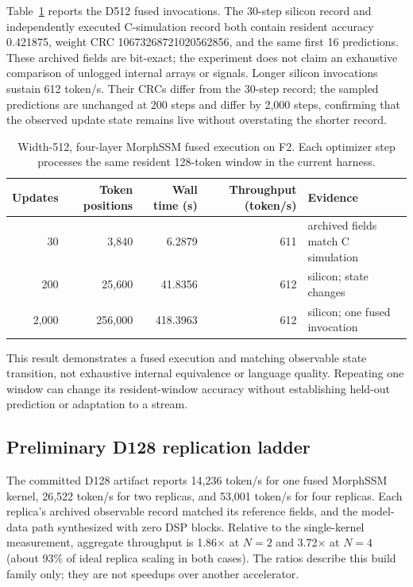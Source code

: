 \documentclass[10pt]{article}
\begin{document}
Table~\ref{tab:d512} reports the D512 fused invocations.  The 30-step silicon
record and independently executed C-simulation record both contain resident
accuracy 0.421875, weight CRC 10673268721020562856, and the same first 16
predictions.  These archived fields are bit-exact; the experiment does not
claim an exhaustive comparison of unlogged internal arrays or signals.  Longer
silicon invocations sustain 612 token/s.  Their CRCs differ from the 30-step
record; the sampled predictions are unchanged at 200 steps and differ by 2,000
steps, confirming that the observed update state remains live without
overstating the shorter record.

\begin{table}[t]
\centering
\caption{Width-512, four-layer MorphSSM fused execution on F2.  Each optimizer
step processes the same resident 128-token window in the current harness.}
\label{tab:d512}
\small
\begin{tabular}{rrrrl}
\toprule
Updates & Token positions & Wall time (s) & Throughput (token/s) & Evidence \\
\midrule
30   & 3,840   & 6.2879   & 611 & archived fields match C simulation \\
200  & 25,600  & 41.8356  & 612 & silicon; state changes \\
2,000& 256,000 & 418.3963 & 612 & silicon; one fused invocation \\
\bottomrule
\end{tabular}
\end{table}

This result demonstrates a fused execution and matching observable state
transition, not exhaustive internal equivalence or language quality.  Repeating
one window can change its resident-window accuracy without establishing
held-out prediction or adaptation to a stream.

\subsection{Preliminary D128 replication ladder}

The committed D128 artifact reports 14,236 token/s for one fused MorphSSM
kernel, 26,522 token/s for two replicas, and 53,001 token/s for four replicas.
Each replica's archived observable record matched its reference fields, and the
model-data path synthesized with zero DSP blocks.  Relative to the single-kernel
measurement, aggregate throughput is 1.86$\times$ at $N=2$ and 3.72$\times$ at
$N=4$ (about 93\% of ideal replica scaling in both cases).  The ratios describe
this build family only; they are not speedups over another accelerator.
\end{document}
